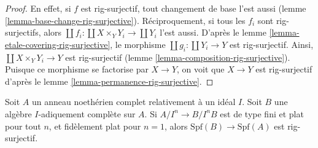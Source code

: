 \begin{proof}
En effet, si $f$ est rig-surjectif, tout changement de base l'est aussi
(lemme \ref{lemma-base-change-rig-surjective}).
Réciproquement, si tous les $f_i$ sont rig-surjectifs, alors
$\coprod f_i : \coprod X \times_Y Y_i \to \coprod Y_i$ l'est aussi.
D'après le lemme \ref{lemma-etale-covering-rig-surjective},
le morphisme $\coprod g_i : \coprod Y_i \to Y$ est rig-surjectif.
Ainsi, $\coprod X \times_Y Y_i \to Y$ est rig-surjectif
(lemme \ref{lemma-composition-rig-surjective}).
Puisque ce morphisme se factorise par $X \to Y$, on voit que $X \to Y$
est rig-surjectif d'après le lemme \ref{lemma-permanence-rig-surjective}.
\end{proof}

\begin{lemma}
\label{lemma-faithfully-flat-rig-surjective}
Soit $A$ un anneau noethérien complet relativement à un idéal $I$.
Soit $B$ une algèbre $I$-adiquement complète sur $A$.
Si $A/I^n \to B/I^nB$ est de type fini et plat pour tout $n$, et
fidèlement plat pour $n = 1$, alors $\text{Spf}(B) \to \text{Spf}(A)$
est rig-surjectif.
\end{lemma}

